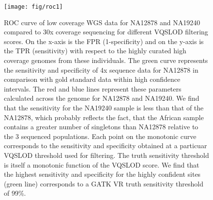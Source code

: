 \begin{figure}
\centering
\texttt{[image: fig/roc1]}
\caption[\Gls{ROC} curve]{\gls{ROC} curve of low coverage \gls{WGS} data for NA12878 and NA19240 compared to 30x coverage sequencing for different \gls{VQSLOD} filtering scores. On the x-axis is the \gls{FPR} (1-specificity) and on the y-axis is the \gls{TPR} (sensitivity) with respect to the highly curated high coverage genomes from these individuals. The green curve represents the sensitivity and specificity of 4x sequence data for NA12878 in comparison with gold standard data within high confidence intervals. The red and blue lines represent these parameters calculated across the genome for NA12878 and NA19240. We find that the sensitivity for the NA19240 sample is less than that of the NA12878, which probably reflects the fact, that the African sample contains a greater number of singletons than NA12878 relative to the 3 sequenced populations. Each point on the monotonic curve corresponds to the sensitivity and specificity obtained at a particuar VQSLOD threshold used for filtering. The truth sensitivity threshold is itself a monotonic function of the VQSLOD score. We find that the highest sensitivity and specificity for the highly confident sites (green line) corresponds to a GATK \gls{VR} truth sensitivity threshold of 99\%.}
\label{fig:roc1}
\end{figure}